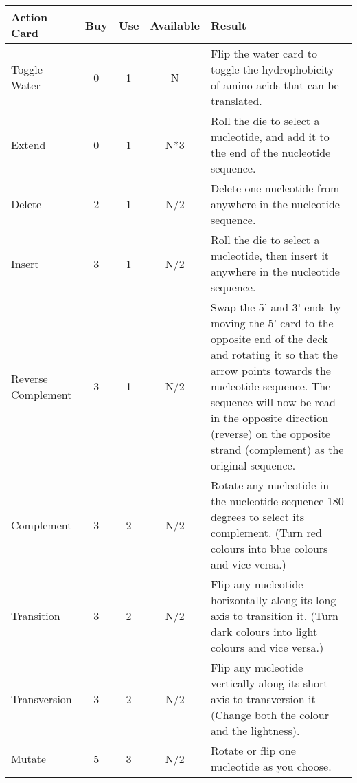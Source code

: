 \documentclass[a4paper,11pt,oneside]{memoir}
\begin{document}
\begin{table}[h!]
\begin{tabular}{lcccp{10cm}}
\hline
\textbf{Action Card} & \textbf{Buy} & \textbf{Use} & \textbf{Available} & \textbf{Result} \\
\hline
    Toggle Water                 & 0 & 1 & N & Flip the water card to toggle the hydrophobicity of amino acids that can be translated. \\
    Extend                       & 0 & 1 & N*3 & Roll the die to select a nucleotide, and add it to the end of the nucleotide sequence.\\
    Delete                       & 2 & 1 & N/2 & Delete one nucleotide from anywhere in the nucleotide sequence. \\
    Insert                       & 3 & 1 & N/2 & Roll the die to select a nucleotide, then insert it anywhere in the nucleotide sequence. \\
    Reverse Complement           & 3 & 1 & N/2 & Swap the 5' and 3' ends by moving the 5' card to the opposite end of the deck and rotating it so that the arrow points towards the nucleotide sequence.  The sequence will now be read in the opposite direction (reverse) on the opposite strand (complement) as the original sequence.  \\
    Complement                   & 3 & 2 & N/2 & Rotate any nucleotide in the nucleotide sequence 180 degrees to select its complement.  (Turn red colours into blue colours and vice versa.) \\
    Transition                   & 3 & 2 & N/2 & Flip any nucleotide horizontally along its long axis to transition it. (Turn dark colours into light colours and vice versa.) \\
    Transversion                 & 3 & 2 & N/2 & Flip any nucleotide vertically along its short axis to transversion it (Change both the colour and the lightness). \\
    Mutate                       & 5 & 3 & N/2 & Rotate or flip one nucleotide as you choose. \\
\hline
\end{tabular}
\label{actiontable}
\end{table}
\end{document}
